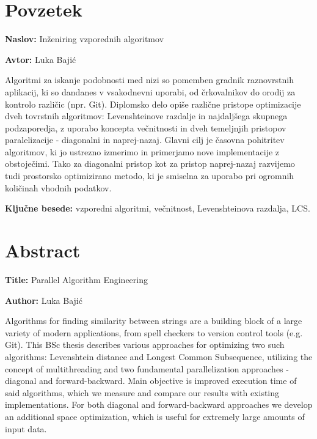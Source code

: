 \documentclass[a4paper,12pt,openright]{book}
\newcommand{\ttitle}{Inženiring vzporednih algoritmov}
\newcommand{\ttitleEn}{Parallel Algorithm Engineering}
\newcommand{\tauthor}{Luka Bajić}
\newcommand{\tkeywords}{vzporedni algoritmi, večnitnost, Levenshteinova razdalja, LCS}
\newcommand{\clearemptydoublepage}{\newpage{\pagestyle{empty}\cleardoublepage}}
\begin{document}
\clearemptydoublepage

{}
\chapter*{Povzetek}

\noindent\textbf{Naslov:} \ttitle
\bigskip

\noindent\textbf{Avtor:} \tauthor
\bigskip

\noindent Algoritmi za iskanje podobnosti med nizi so pomemben gradnik raznovrstnih aplikacij, ki so dandanes v vsakodnevni uporabi, od črkovalnikov do orodij za kontrolo različic (npr. Git). Diplomsko delo opiše različne pristope optimizacije dveh tovrstnih algoritmov: Levenshteinove razdalje in najdaljšega skupnega podzaporedja, z uporabo koncepta večnitnosti in dveh temeljnjih pristopov paralelizacije - diagonalni in naprej-nazaj. Glavni cilj je časovna pohitritev algoritmov, ki jo ustrezno izmerimo in primerjamo nove implementacije z obstoječimi. Tako za diagonalni pristop kot za pristop naprej-nazaj razvijemo tudi prostorsko optimizirano metodo, ki je smiselna za uporabo pri ogromnih količinah vhodnih podatkov. 

\bigskip

\noindent\textbf{Ključne besede:} \tkeywords.
\clearemptydoublepage

{}
\chapter*{Abstract}

\noindent\textbf{Title:} \ttitleEn
\bigskip

\noindent\textbf{Author:} \tauthor
\bigskip

\noindent Algorithms for finding similarity between strings are a building block of a large variety of modern applications, from spell checkers to version control tools (e.g. Git). This BSc thesis describes various approaches for optimizing two such algorithms: Levenshtein distance and Longest Common Subsequence, utilizing the concept of multithreading and two fundamental parallelization approaches - diagonal and forward-backward. Main objective is improved execution time of said algorithms, which we measure and compare our results with existing implementations. For both diagonal and forward-backward approaches we develop an additional space optimization, which is useful for extremely large amounts of input data.
\end{document}
